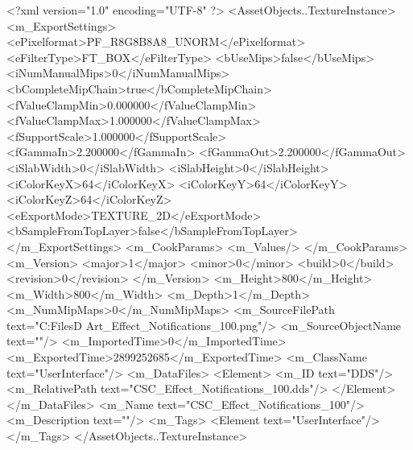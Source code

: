 <?xml version="1.0" encoding="UTF-8" ?>
<AssetObjects..TextureInstance>
	<m_ExportSettings>
		<ePixelformat>PF_R8G8B8A8_UNORM</ePixelformat>
		<eFilterType>FT_BOX</eFilterType>
		<bUseMips>false</bUseMips>
		<iNumManualMips>0</iNumManualMips>
		<bCompleteMipChain>true</bCompleteMipChain>
		<fValueClampMin>0.000000</fValueClampMin>
		<fValueClampMax>1.000000</fValueClampMax>
		<fSupportScale>1.000000</fSupportScale>
		<fGammaIn>2.200000</fGammaIn>
		<fGammaOut>2.200000</fGammaOut>
		<iSlabWidth>0</iSlabWidth>
		<iSlabHeight>0</iSlabHeight>
		<iColorKeyX>64</iColorKeyX>
		<iColorKeyY>64</iColorKeyY>
		<iColorKeyZ>64</iColorKeyZ>
		<eExportMode>TEXTURE_2D</eExportMode>
		<bSampleFromTopLayer>false</bSampleFromTopLayer>
	</m_ExportSettings>
	<m_CookParams>
		<m_Values/>
	</m_CookParams>
	<m_Version>
		<major>1</major>
		<minor>0</minor>
		<build>0</build>
		<revision>0</revision>
	</m_Version>
	<m_Height>800</m_Height>
	<m_Width>800</m_Width>
	<m_Depth>1</m_Depth>
	<m_NumMipMaps>0</m_NumMipMaps>
	<m_SourceFilePath text="C:\Users\Shadow\Desktop\Working Files\2D Art\Effects\CSC_Effect_Notifications_100.png"/>
	<m_SourceObjectName text=""/>
	<m_ImportedTime>0</m_ImportedTime>
	<m_ExportedTime>2899252685</m_ExportedTime>
	<m_ClassName text="UserInterface"/>
	<m_DataFiles>
		<Element>
			<m_ID text="DDS"/>
			<m_RelativePath text="CSC_Effect_Notifications_100.dds"/>
		</Element>
	</m_DataFiles>
	<m_Name text="CSC_Effect_Notifications_100"/>
	<m_Description text=""/>
	<m_Tags>
		<Element text="UserInterface"/>
	</m_Tags>
</AssetObjects..TextureInstance>

